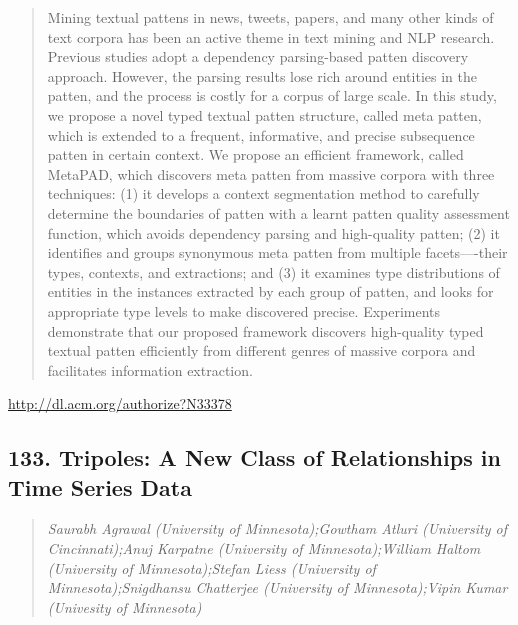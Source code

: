 \documentclass{article}
\begin{document}
\begin{quote}
Mining textual pattens in news, tweets, papers, and many other kinds of text corpora has been an active theme in text mining and NLP research. Previous studies adopt a dependency parsing-based patten discovery approach. However, the parsing results lose rich around entities in the patten, and the process is costly for a corpus of large scale. In this study, we propose a novel typed textual patten structure, called meta patten, which is extended to a frequent, informative, and precise subsequence patten in certain context. We propose an efficient framework, called MetaPAD, which discovers meta patten from massive corpora with three techniques: (1) it develops a context segmentation method to carefully determine the boundaries of patten with a learnt patten quality assessment function, which avoids dependency parsing and high-quality patten; (2) it identifies and groups synonymous meta patten from multiple facets—-their types, contexts, and extractions; and (3) it examines type distributions of entities in the instances extracted by each group of patten, and looks for appropriate type levels to make discovered precise. Experiments demonstrate that our proposed framework discovers high-quality typed textual patten efficiently from different genres of massive corpora and facilitates information extraction.
\end{quote}

\href{http://dl.acm.org/authorize?N33378}{http://dl.acm.org/authorize?N33378}

\subsection{133. Tripoles: A New Class of Relationships in Time Series Data}

\begin{quote}
\footnotesize{\textit{Saurabh Agrawal (University of Minnesota);Gowtham Atluri (University of Cincinnati);Anuj Karpatne (University of Minnesota);William Haltom (University of Minnesota);Stefan Liess (University of Minnesota);Snigdhansu Chatterjee (University of Minnesota);Vipin Kumar (Univesity of Minnesota)}}

\end{quote}
\end{document}
